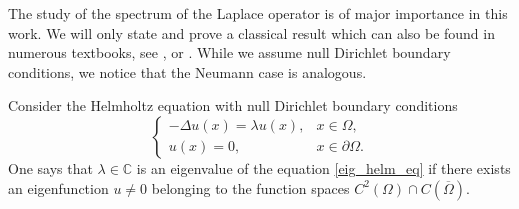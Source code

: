 The study of the spectrum of the Laplace operator is of major importance in this work. We will only state and prove a classical result which can also be found in numerous textbooks, see \cite{brezis2011functional} \cite{arendt2010partielle}, \cite{courant2008methods} or \cite{borthwick2020spectral}. While we assume null Dirichlet boundary conditions, we notice that the Neumann case is analogous.

\begin{definition}\label{eig_def}
    Consider the Helmholtz equation with null Dirichlet boundary conditions
    \begin{equation}\label{eig_helm_eq}
        \begin{cases}
            -\Delta u(x) = \lambda u(x), & x \in \Omega, \\
            u(x) = 0, & x \in \partial \Omega.
        \end{cases}
    \end{equation}
    One says that \(\lambda \in \mathbb{C}\) is an eigenvalue of the equation \eqref{eig_helm_eq} if there exists an eigenfunction \(u \neq 0\) belonging to the function spaces \(C^2(\Omega) \cap C(\overline{\Omega})\).
\end{definition}

